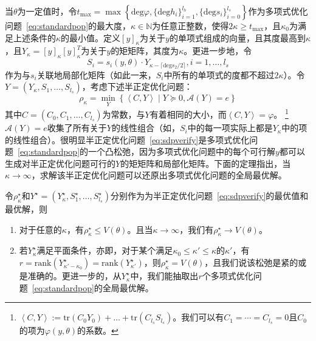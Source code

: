 当$\theta$为一定值时，令$t_{\max} = \max\left\{ \text{deg}\varphi, \{\text{deg} h_i\}_{i=1}^{l_h}, \{\text{deg}s_i\}_{i=0}^{l_s} \right\}$作为多项式优化问题~\eqref{eq:standardpop}的最大度，$\kappa \in \mathbb{N}$为任意正整数，使得$2 \kappa \ge t_{\max}$，且$\kappa_0$为满足上述条件的$\kappa$的最小值。定义$[y]_\kappa$为关于$y$的单项式组成的向量，且其度最高到$\kappa$，且$Y_\kappa = [y]_\kappa [y]_\kappa^T$为关于$y$的矩矩阵，其度为$\kappa$。更进一步地，令
\begin{equation}
    S_i = s_i(y, \theta) \cdot Y_{\kappa - \lceil \text{deg}s_2/2 \rceil}, i = 1, \dots, l_s
\end{equation}
作为与$s_i$关联地局部化矩阵（如此一来，$S_i$中所有的单项式的度都不超过$2\kappa$）。令$Y = \left( Y_\kappa, S_1, \dots, S_{l_s} \right)$，考虑下述半正定优化问题：
\begin{equation}\label{eq:sdpverify}
    \rho_\kappa = \min_{Y}\left\{ \left< C, Y \right> \mid Y \succeq 0, \mathcal{A}(Y) = e \right\}
\end{equation}
其中$C = (C_0, C_1, \dots, C_{l_s})$为常数，与$Y$有着相同的大小，而$\left< C, Y \right> = \varphi$。
\footnote{$\left< C, Y \right> := \text{tr}(C_0 Y_0) + \dots + \text{tr}(C_{l_s} S_{l_s})$。我们可以有$C_1 = \cdots = C_{l_s} = 0$且$C_0$的项为$\varphi(y, \theta)$的系数。}
$\mathcal{A}(Y) = e$收集了所有关于$Y$的线性组合（如，$S_i$中的每一项实际上都是$Y_\kappa$中的项的线性组合）。很明显半正定优化问题~\eqref{eq:sdpverify}是多项式优化问题~\eqref{eq:standardpop}的一个凸松弛，因为多项式优化问题中的每个可行解$y$都可以生成对半正定优化问题可行的$Y$的矩矩阵和局部化矩阵。下面的定理指出，当$\kappa \rightarrow \infty$，求解该半正定优化问题可以还原出多项式优化问题的全局最优解。

\begin{theorem}\label{thm:lasserre}
    令$\rho_\kappa^\star$和$Y^\star = \left( Y_\kappa^\star, S_1^\star, \dots, S_{l_s}^\star \right)$分别作为为半正定优化问题~\eqref{eq:sdpverify}的最优值和最优解，则
    \begin{enumerate}
        \item 对于任意的$\kappa$，有$\rho_\kappa^\star \le V(\theta)$。且当$\kappa \rightarrow \infty$，我们有$\rho_\kappa^\star \rightarrow V(\theta)$。
        \item 若$Y_\kappa^\star$满足平面条件，亦即，对于某个满足$\kappa_0 \le \kappa' \le \kappa$的$\kappa'$，有$r = \text{rank}(Y_{\kappa' - \kappa_0}^\star) = \text{rank}(Y_{\kappa'}^\star)$，则$\rho_\kappa^\star = V(\theta)$，且我们说该松弛是紧的或是准确的。更进一步的，从$Y_\kappa^\star$中，我们能抽取出$r$个多项式优化问题~\eqref{eq:standardpop}的全局最优解。
    \end{enumerate}
\end{theorem}


